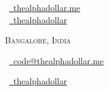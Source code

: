 \documentclass[a4paper,10pt]{extarticle} %
\begin{document}
\pagestyle{empty} %


\begin{multicols}{3}
\normalsize  \faGlobe\ {\href{https://thealphadollar.me/}{\  thealphadollar.me}}\\
\normalsize \faGithub\ {\href{https://github.com/thealphadollar}{\  thealphadollar}}\\
\columnbreak
\normalsize\par{\centering{\huge\textsc{\textcolor{primary}{Shivam Kumar Jha}}}\par} %
\par{\centering\normalsize {\textsc{Bangalore, India}}\hfill\par}
\columnbreak
\raggedright\hfill\normalsize \faEnvelope\ {\href{mailto:code@thealphadollar.me}{\  code@thealphadollar.me}}\\
\raggedright\hfill\normalsize \faLinkedinSquare\ {\href{https://www.linkedin.com/in/thealphadollar}{\  thealphadollar}}\\
\end{multicols}
\vspace{-0.4 cm}

\end{document}
